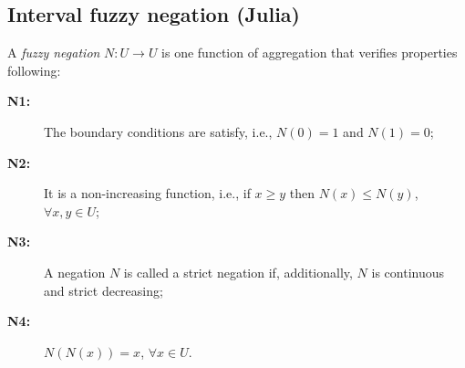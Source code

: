 \documentclass[12pt]{article}
\theoremstyle{plain}
\theoremstyle{remark}
\theoremstyle{definition}
\theoremstyle{proposition}
\begin{document}
\subsection{Interval fuzzy negation (Julia)}\label{subsec-4c} 

A \emph{fuzzy negation} $N:U \rightarrow U$ is one function of aggregation that verifies properties following:

\begin{description}
\item [\textbf{N1:}]  The boundary conditions are satisfy, i.e., $N(0) = 1$ and $N(1) = 0$;

\item [\textbf{N2:}] It is a non-increasing function, i.e., if $x \geq y$ then $N(x)\leq N(y)$, $\forall x,y \in U$;

\item [\textbf{N3:}] A negation $N$ is called a strict negation if, additionally, $N$ is continuous and strict decreasing; 

\item [\textbf{N4:}] $N(N(x))=x$, $\forall x \in U$.
\end{description}
\end{document}
